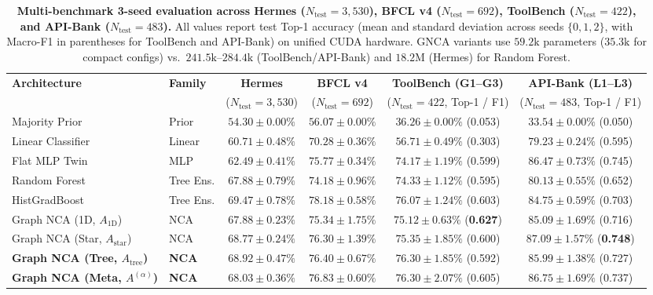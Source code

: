 \documentclass[10pt,twocolumn,letterpaper]{article}
\begin{document}
\begin{table}[tbp]
\centering
\small
\setlength{\tabcolsep}{2.5pt}
\caption{\textbf{Multi-benchmark 3-seed evaluation across Hermes ($N_{\text{test}}{=}3{,}530$), BFCL v4 ($N_{\text{test}}{=}692$), ToolBench ($N_{\text{test}}{=}422$), and API-Bank ($N_{\text{test}}{=}483$).} All values report test Top-1 accuracy (mean and standard deviation across seeds $\{0, 1, 2\}$, with Macro-F1 in parentheses for ToolBench and API-Bank) on unified CUDA hardware. GNCA variants use $59.2\text{k}$ parameters ($35.3\text{k}$ for compact configs) vs.\ $241.5\text{k}$--$284.4\text{k}$ (ToolBench/API-Bank) and $18.2\text{M}$ (Hermes) for Random Forest.}
\label{tab:multi-benchmark}
\vspace{6pt}
\begin{tabular*}{\textwidth}{@{\extracolsep{\fill}}llcccc@{}}
\toprule
\textbf{Architecture} & \textbf{Family} & \textbf{Hermes} & \textbf{BFCL v4} & \textbf{ToolBench (G1--G3)} & \textbf{API-Bank (L1--L3)} \\
 & & ($N_{\text{test}}{=}3{,}530$) & ($N_{\text{test}}{=}692$) & ($N_{\text{test}}{=}422$, Top-1 / F1) & ($N_{\text{test}}{=}483$, Top-1 / F1) \\
\midrule
Majority Prior & Prior & $54.30 \pm 0.00\%$ & $56.07 \pm 0.00\%$ & $36.26 \pm 0.00\%$ (0.053) & $33.54 \pm 0.00\%$ (0.050) \\
Linear Classifier & Linear & $60.71 \pm 0.48\%$ & $70.28 \pm 0.36\%$ & $56.71 \pm 0.49\%$ (0.303) & $79.23 \pm 0.24\%$ (0.595) \\
Flat MLP Twin & MLP & $62.49 \pm 0.41\%$ & $75.77 \pm 0.34\%$ & $74.17 \pm 1.19\%$ (0.599) & $86.47 \pm 0.73\%$ (0.745) \\
Random Forest & Tree Ens. & $67.88 \pm 0.79\%$ & $74.18 \pm 0.96\%$ & $74.33 \pm 1.12\%$ (0.595) & $80.13 \pm 0.55\%$ (0.652) \\
HistGradBoost & Tree Ens. & $\mathbf{69.47 \pm 0.78\%}$ & $\mathbf{78.18 \pm 0.58\%}$ & $76.07 \pm 1.24\%$ (0.603) & $84.75 \pm 0.59\%$ (0.703) \\
\midrule
Graph NCA (1D, $A_{\text{1D}}$) & NCA & $67.88 \pm 0.23\%$ & $75.34 \pm 1.75\%$ & $75.12 \pm 0.63\%$ (\textbf{0.627}) & $85.09 \pm 1.69\%$ (0.716) \\
Graph NCA (Star, $A_{\text{star}}$) & NCA & $68.77 \pm 0.24\%$ & $76.30 \pm 1.39\%$ & $75.35 \pm 1.85\%$ (0.600) & $\mathbf{87.09 \pm 1.57\%}$ (\textbf{0.748}) \\
\textbf{Graph NCA (Tree, $A_{\text{tree}}$)} & \textbf{NCA} & $\mathbf{68.92 \pm 0.47\%}$ & $76.40 \pm 0.67\%$ & $\mathbf{76.30 \pm 1.85\%}$ (0.592) & $85.99 \pm 1.38\%$ (0.727) \\
\textbf{Graph NCA (Meta, $A^{(\alpha)}$)} & \textbf{NCA} & $68.03 \pm 0.36\%$ & $\mathbf{76.83 \pm 0.60\%}$ & $\mathbf{76.30 \pm 2.07\%}$ (0.605) & $\mathbf{86.75 \pm 1.69\%}$ (0.737) \\
\bottomrule
\end{tabular*}
\end{table}
\end{document}
